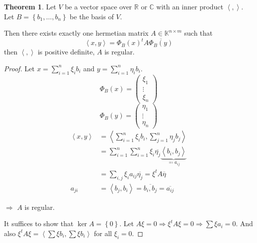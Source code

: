 \documentclass[a4paper,landscape,twocolumn]{article}
\newcommand\set[1]{\left\{#1\right\}}
\newcommand\functional[1]{\left\langle{#1}\right\rangle}
\theoremstyle{definition}
\newtheorem{theorem}{Theorem}
\DeclareMathOperator\kernel{ker} %
\begin{document}
\begin{theorem}
  \label{theorem-8.21}
  Let $V$ be a vector space over $\mathbb R$ or $\mathbb C$ with an inner product $\functional{,}$.
  Let $B = \set{b_1, \ldots, b_n}$ be the basis of $V$.

  Then there exists exactly one hermetian matrix $A \in \mathbb K^{n\times m}$
  such that
  \[ \functional{x,y} = \Phi_B (x)^t A \overline{\Phi_B (y)} \]
  then $\functional{,}$ is positive definite, $A$ is regular.
\end{theorem}

\begin{proof}
  Let $x = \sum_{i=1}^n \xi_i b_i$ and $y = \sum_{i=1}^n \eta_i b_i$.
  \[ \Phi_B(x) = \begin{pmatrix} \xi_1 \\ \vdots \\ \xi_n \end{pmatrix} \]
  \[ \Phi_B(y) = \begin{pmatrix} \eta_1 \\ \vdots \\ \eta_n \end{pmatrix} \]
  \begin{align*}
    \functional{x,y}
      &= \functional{\sum_{i=1}^n \xi_i b_i, \sum_{j=1}^n \eta_j b_j} \\
      &= \sum_{i=1}^n \sum_{i=1}^n \xi_i \overline{\eta_j} \underbrace{\functional{b_i, b_j}}_{\eqqcolon a_{ij}} \\
      &= \sum_{i,j} \xi_i a_{ij} \overline{\eta_j} = \xi^t A \overline{\eta} \\
    a_{ji} &= \functional{b_j,b_i} = \overline{b_i,b_j} = \overline{a_{ij}}
  \end{align*}


   $\Rightarrow$ $A$ is regular.

   It suffices to show that $\kernel{A} = \set{0}$.
   Let $A \xi = 0 \Rightarrow \xi^t A \xi = 0 \Rightarrow \sum \xi a_i = 0$.
   And also $\xi^t A \xi = \functional{\sum \xi b_i, \sum \xi b_i}$ for all $\xi_i = 0$.
\end{proof}
\end{document}
